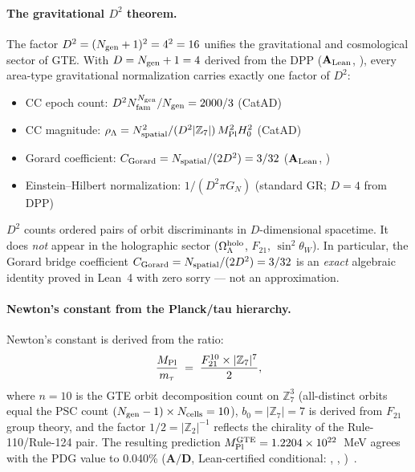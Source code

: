 \paragraph{The gravitational $D^2$ theorem.}
The factor $D^2 = (N_{\rm gen}+1)^2 = 4^2 = 16$ unifies the gravitational and
cosmological sector of GTE.  With $D = N_{\rm gen}+1 = 4$ derived from the DPP
($\mathbf{A}_{\rm Lean}$, ), every
area-type gravitational normalization carries exactly one factor of $D^2$:
\begin{itemize}[noitemsep,topsep=2pt]
  \item CC epoch count: $D^2 N_{\rm fam}^{N_{\rm gen}}/N_{\rm gen} = 2000/3$ (CatAD)
  \item CC magnitude: $\rho_\Lambda = N_{\rm spatial}^2/(D^2|\mathbb{Z}_7|)\,M_{\rm Pl}^2 H_0^2$ (CatAD)
  \item Gorard coefficient: $C_{\rm Gorard} = N_{\rm spatial}/(2D^2) = 3/32$
    ($\mathbf{A}_{\rm Lean}$, )
  \item Einstein--Hilbert normalization: $1/(D^2\pi G_N)$ (standard GR; $D=4$ from DPP)
\end{itemize}
$D^2$ counts ordered pairs of orbit discriminants in $D$-dimensional spacetime.
It does \emph{not} appear in the holographic sector ($\Omega_\Lambda^{\rm holo}$,
$F_{21}$, $\sin^2\theta_W$).  In particular, the Gorard bridge coefficient
$C_{\rm Gorard} = N_{\rm spatial}/(2D^2) = 3/32$ is an \emph{exact} algebraic
identity proved in Lean~4 with zero sorry --- not an approximation.

\paragraph{Newton's constant from the Planck/tau hierarchy.}
Newton's constant is derived from the ratio:
\[
  \frac{M_{\rm Pl}}{m_\tau} \;=\; \frac{F_{21}^{10} \times |\mathbb{Z}_7|^7}{2},
\]
where $n = 10$ is the GTE orbit decomposition count on $\mathbb{Z}_7^3$
(all-distinct orbits equal the PSC count $(N_{\rm gen}-1)\times N_{\rm cells} = 10$),
$b_0 = |\mathbb{Z}_7| = 7$ is derived from $F_{21}$ group theory, and the factor
$1/2 = |\mathbb{Z}_2|^{-1}$ reflects the chirality of the Rule-110/Rule-124 pair.
The resulting prediction $M_{\rm Pl}^{\rm GTE} = 1.2204 \times 10^{22}$~MeV agrees
with the PDG value to 0.040\% ($\mathbf{A/D}$, Lean-certified conditional:
, ,
)~\cite{SpivackCompleteness}.

